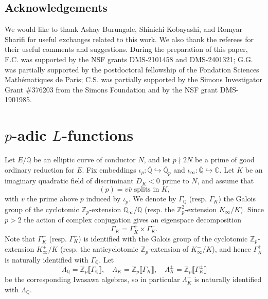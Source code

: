 \documentclass[a4paper,10pt]{amsart}
\numberwithin{equation}{section}
\numberwithin{equation}{section}
\theoremstyle{plain}
\theoremstyle{definition}
\theoremstyle{definition}
\theoremstyle{plain}
\theoremstyle{plain}
\theoremstyle{plain}
\theoremstyle{plain}
\newcommand{\Z}{\mathbb{Z}}
\newcommand{\Q}{\mathbb{Q}}
\newcommand{\C}{\mathbb{C}}
\newcommand{\Lcal}{\mathcal{L}}
\begin{document}


\subsection{Acknowledgements}
We would like to thank Ashay Burungale, Shinichi Kobayashi, and Romyar Sharifi for useful exchanges related to this work. We also thank the referees for their useful comments and suggestions.  
During the preparation of this paper, F.C. was supported by the NSF grants DMS-2101458 and DMS-2401321; G.G. was partially supported by the postdoctoral fellowship of the Fondation Sciences Math\'{e}matiques de Paris; C.S. was partially supported by the Simons Investigator Grant \#376203 from the Simons Foundation and by the NSF grant DMS-1901985. 



\section{$p$-adic $L$-functions}
\label{sec:Lp}

Let $E/\Q$ be an elliptic curve of conductor $N$, and let $p\nmid 2N$ be a prime of good ordinary reduction for $E$. Fix embeddings $\iota_p:\overline{\Q}\hookrightarrow\overline{\Q}_p$ and $\iota_\infty:\overline{\Q}\hookrightarrow\C$. Let $K$ be an imaginary quadratic field of discriminant $D_K<0$ prime to $N$, and assume that
\begin{equation}\label{eq:spl}
\textrm{$(p)=v\bar{v}$ splits in $K$,}\tag{spl}
\end{equation}
with $v$ the prime above $p$ induced by $\iota_p$. 
We denote by $\Gamma_{\Q}$  (resp. $\Gamma_K$) the Galois group of the cyclotomic $\Z_p$-extension $\Q_{\infty}/\Q$ (resp. the $\Z_p^2$-extension $K_{\infty}/K$). Since $p>2$ the action of complex conjugation gives an eigenspace decomposition 
\[
\Gamma_K=\Gamma_K^+\times \Gamma_K^-.
\] 
Note that $\Gamma_K^+$ (resp. $\Gamma_K^-$) is identified with the Galois group of the cyclotomic $\Z_p$-extension $K_\infty^+/K$ (resp. the anticyclotomic $\Z_p$-extension of $K^-_{\infty}/K$), and 
hence $\Gamma^+_K$ is naturally identified with $\Gamma_\Q$. Let 
\[
\Lambda_\Q=\Z_p\llbracket{\Gamma_\Q}\rrbracket,\quad
\Lambda_K=\Z_p\llbracket{\Gamma_K}\rrbracket,\quad\Lambda_K^\pm=\Z_p\llbracket\Gamma_K^\pm\rrbracket
\]
be the corresponding Iwasawa algebras, so in particular $\Lambda_K^+$ is naturally identified with $\Lambda_\Q$.
\end{document}
